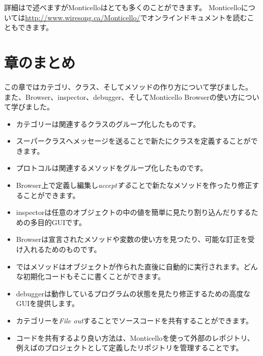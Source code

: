 \documentclass[a4paper,10pt,twoside]{book}
\begin{document}
詳細はで述べますがMonticelloはとても多くのことができます。
Monticelloについては\url{http://www.wiresong.ca/Monticello/}でオンラインドキュメントを読むこともできます。

\section{章のまとめ}
この章ではカテゴリ、クラス、そしてメソッドの作り方について学びました。
また、Browser、inspector、debugger、そしてMonticello Browserの使い方について学びました。

\begin{itemize}
  \item カテゴリーは関連するクラスのグループ化したものです。
  \item スーパークラスへメッセージを送ることで新たにクラスを定義することができます。
  \item プロトコルは関連するメソッドをグループ化したものです。
  \item Browser上で定義し編集し\emph{acceptする}ことで新たなメソッドを作ったり修正することができます。
  \item inspectorは任意のオブジェクトの中の値を簡単に見たり割り込んだりするための多目的GUIです。
  \item Browserは宣言されたメソッドや変数の使い方を見つたり、可能な訂正を受け入れるためのものです。
  \item \pharo ではメソッドはオブジェクトが作られた直後に自動的に実行されます。どんな初期化コードもそこに書くことができます。
  \item debuggerは動作しているプログラムの状態を見たり修正するための高度なGUIを提供します。
  \item カテゴリーを\emph{File out}することでソースコードを共有することができます。
  \item コードを共有するより良い方法は、Monticelloを使って外部のレポジトリ、例えば\sqsrc のプロジェクトとして定義したリポジトリを管理することです。
\end{itemize}

\ifx\wholebook\relax\else
\end{document}
